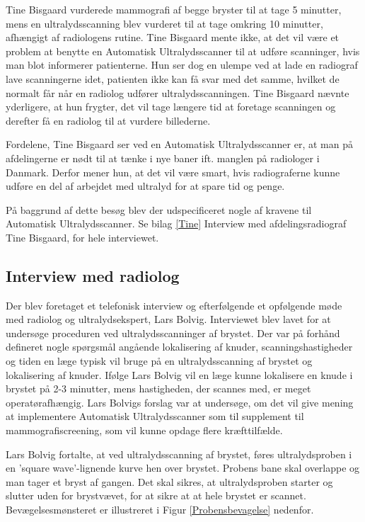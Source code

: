 Tine Bisgaard vurderede mammografi af begge bryster til at tage 5 minutter, mens en ultralydsscanning blev vurderet til at tage omkring 10 minutter, afhængigt af radiologens rutine. Tine Bisgaard mente ikke, at det vil være et problem at benytte en Automatisk Ultralydsscanner til at udføre scanninger, hvis man blot informerer patienterne. Hun ser dog en ulempe ved at lade en radiograf lave scanningerne idet, patienten ikke kan få svar med det samme, hvilket de normalt får når en radiolog udfører ultralydsscanningen. Tine Bisgaard nævnte yderligere, at hun frygter, det vil tage længere tid at foretage scanningen og derefter få en radiolog til at vurdere billederne.

Fordelene, Tine Bisgaard ser ved en Automatisk Ultralydsscanner er, at man på afdelingerne er nødt til at tænke i nye baner ift. manglen på radiologer i Danmark. Derfor mener hun, at det vil være smart, hvis radiograferne kunne udføre en del af arbejdet med ultralyd for at spare tid og penge.

På baggrund af dette besøg blev der udspecificeret nogle af kravene til Automatisk Ultralydsscanner. Se bilag \ref{Tine} Interview med afdelingsradiograf Tine Bisgaard, for hele interviewet. 

\subsection{Interview med radiolog}
Der blev foretaget et telefonisk interview og efterfølgende et opfølgende møde med radiolog og ultralydsekspert, Lars Bolvig. Interviewet blev lavet for at undersøge proceduren ved ultralydsscanninger af brystet. Der var på forhånd defineret nogle spørgsmål angående lokalisering af knuder, scanningshastigheder og tiden en læge typisk vil bruge på en ultralydsscanning af brystet og lokalisering af knuder. Ifølge Lars Bolvig vil en læge kunne lokalisere en knude i brystet på 2-3 minutter, mens hastigheden, der scannes med, er meget operatørafhængig. Lars Bolvigs forslag var at undersøge, om det vil give mening at implementere Automatisk Ultralydsscanner som til supplement til mammografiscreening, som vil kunne opdage flere kræfttilfælde. 

Lars Bolvig fortalte, at ved ultralydsscanning af brystet, føres ultralydsproben i en 'square wave'-lignende kurve hen over brystet. Probens bane skal overlappe og man tager et bryst af gangen. Det skal sikres, at ultralydsproben starter og slutter uden for brystvævet, for at sikre at at hele brystet er scannet. Bevægelsesmønsteret er illustreret i Figur \ref{Probensbevagelse} nedenfor. 

